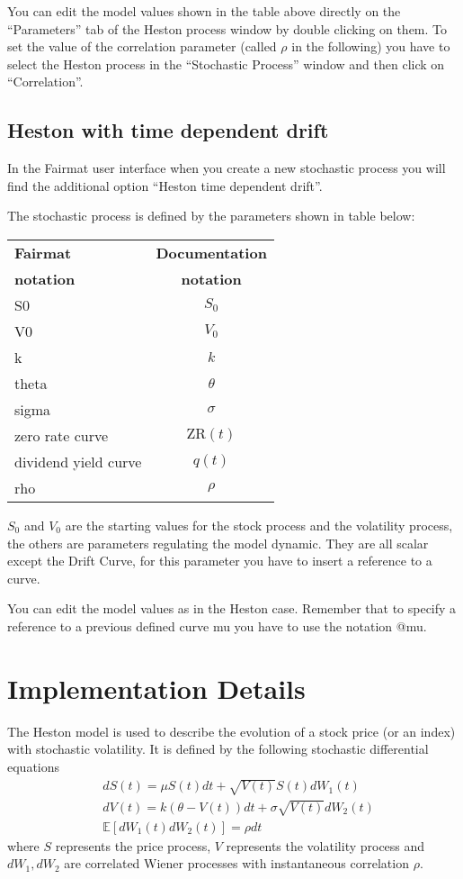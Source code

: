You can edit the model values shown in the table above directly on the ``Parameters'' tab of the Heston process window by double clicking on them. To set the value of the correlation parameter (called $\rho$ in the following) you have to select the Heston process in the ``Stochastic Process'' window and then click on ``Correlation''.

\subsection{Heston with time dependent drift}

In the Fairmat user interface when you create a new stochastic process you will find the additional option ``Heston time dependent drift''.

The stochastic process is defined by the parameters shown in table below:
\begin{center}
\begin{tabular}{|l|c|}
  \hline
\textbf{Fairmat}&\textbf{Documentation}\\
\textbf{notation}&\textbf{notation}\\
                     \hline
 S0     & $S_0$\\
 V0     & $V_0$\\
 k      & $k$ \\
 theta  & $\theta$\\
 sigma  & $\sigma$\\
 zero rate curve    & $\mathrm{ZR}(t)$\\
 dividend yield curve    & $q(t)$\\
rho & $\rho$ \\ 
   \hline
\end{tabular}
\end{center}
$S_0$ and $V_0$ are the starting values for the stock process and the volatility process, the others are parameters regulating the model dynamic. They are all scalar except the Drift Curve, for this parameter you have to insert a reference to a curve.

You can edit the model values as in the Heston case. Remember that to specify a reference to a previous defined curve {\ttfamily mu} you have to use the notation {\ttfamily @mu}.

\section{Implementation Details}

The Heston model is used to describe the evolution of a stock price (or an index) with stochastic volatility. It is defined by the following stochastic differential equations
\begin{align}
& dS(t) = \mu S(t)dt + \sqrt{V(t)}S(t)dW_1(t)\label{eq:dsh}\\
& dV(t) = k(\theta - V(t))dt + \sigma\sqrt{V(t)}dW_2(t)\\
& \mathbb{E}[dW_1(t)dW_2(t)] = \rho dt
\end{align}
where $S$ represents the price process, $V$ represents the volatility process and $dW_1, dW_2$ are correlated Wiener processes with instantaneous correlation $\rho$.

